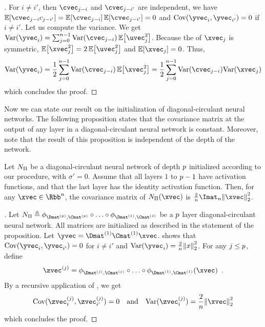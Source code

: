 \begin{proof}[]
  For $i \neq i'$, then $\cvec_{j-i}$ and $\cvec_{j-i'}$ are independent, we have $\Ebb\left[\cvec_{j-i}c_{j-i'}\right] = \Ebb\left[\cvec_{j-i}\right] \Ebb\left[\cvec_{j-i'}\right] = 0$ and $\Cov(\yvec_i,\yvec_{i'}) = 0$ if $i \neq i'$.
  Let us compute the variance.
  We get $\Var(\yvec_i) = \sum_{j=0}^{n-1} \Var(\cvec_{j-i}) \Ebb\left[\uvec_j^2\right]$.
  Because the \pdf of $\xvec_j$ is symmetric, $\Ebb\left[\xvec_j^2\right] = 2\Ebb\left[\uvec_j^2\right]$ and $\Ebb\left[\xvec_j\right] = 0$.
  Thus, 
  \begin{equation}
    \Var(\yvec_i) = \frac{1}{2} \sum_{j=0}^{n-1} \Var(\cvec_{j-i}) \Ebb\left[\xvec_j^2\right] = \frac{1}{2} \sum_{j=0}^{n-1} \Var(\cvec_{j-i}) \Var(\xvec_j)
  \end{equation}
  which concludes the proof.
\end{proof}

Now we can state our result on the initialization of diagonal-circulant neural networks.
The following proposition states that the covariance matrix at the output of any layer in a diagonal-circulant neural network is constant.
Moreover, note that the result of this proposition is independent of the depth of the network.

\begin{proposition} \label{proposition:ch4-initialization_dcnn}
  Let $N_\Pi$ be a diagonal-circulant neural network of depth $p$ initialized according to our procedure, with $\sigma'=0$.
  Assume that all layers $1$ to $p-1$ have \relu activation functions, and that the last layer has the identity activation function.
  Then, for any $\xvec \in \Rbb^n$, the covariance matrix of $\nn_\Pi(\xvec)$ is $\frac{2}{n} \Imat_n \norm{\xvec}_2^2$.
\end{proposition}

\begin{proof}[]
  Let $\nn_\Pi \triangleq \layer_{\Dmat^{(\depth)}, \Cmat^{(\depth)}} \circ \ldots \circ \layer_{\Dmat^{(1)}, \Cmat^{(1)}}$ be a $p$ layer diagonal-circulant neural network.
  All matrices are initialized as described in the statement of the proposition.
  Let $\yvec = \Dmat^{(1)} \Cmat^{(1)} \xvec$.
   shows that $\Cov(\yvec_{i}, \yvec_{i'}) = 0$ for $i \neq i'$ and $\Var(\yvec_{i}) = \frac{2}{n}\norm{x}_{2}^{2}$.
  For any $j \le p$, define 
  \begin{equation}
    \zvec^{(j)} = \layer_{\Dmat^{(j)}, \Cmat^{(j)}} \circ \ldots \circ \layer_{\Dmat^{(1)}, \Cmat^{(1)}}(\xvec) \enspace.
  \end{equation}
  By a recursive application of , we get
  \begin{equation}
    \Cov(\zvec_i^{(j)}, \zvec_{i'}^{(j)}) = 0 \quad \text{and} \quad  \Var(\zvec_i^{(j)}) = \frac{2}{n} \norm{\xvec}_2^2
  \end{equation}
   which concludes the proof.
\end{proof}

